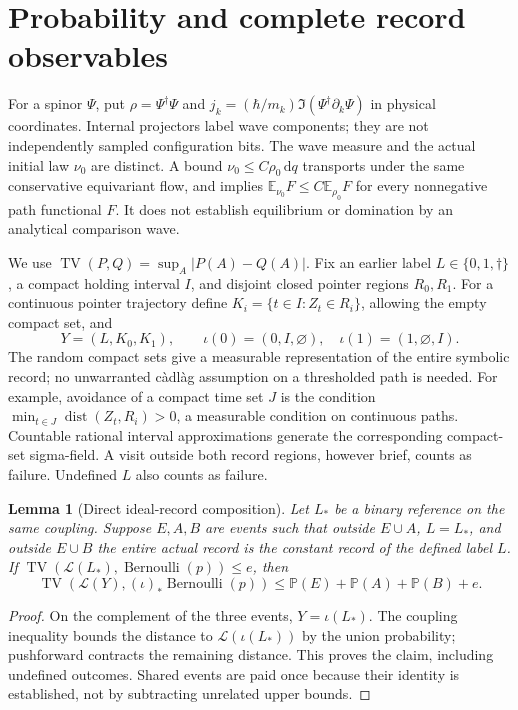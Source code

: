 \documentclass[11pt]{article}
\newtheorem{lemma}[theorem]{Lemma}
\theoremstyle{definition}\newtheorem{definition}[theorem]{Definition}
\theoremstyle{remark}\newtheorem{remark}[theorem]{Remark}
\newcommand{\Prob}{\mathbb P}\newcommand{\E}{\mathbb E}
\newcommand{\TV}{\operatorname{TV}}\newcommand{\Var}{\operatorname{Var}}
\newcommand{\dd}{\,\mathrm d}\newcommand{\Imv}{\operatorname{Im}}\newcommand{\ii}{\mathrm i}
\begin{document}
\section{Probability and complete record observables}
For a spinor $\Psi$, put $\rho=\Psi^\dagger\Psi$ and
$j_k=(\hbar/m_k)\Im(\Psi^\dagger\partial_k\Psi)$ in physical coordinates.
Internal projectors label wave components; they are not independently sampled
configuration bits. The wave measure and the actual initial law $\nu_0$ are
distinct. A bound $\nu_0\le C\rho_0\dd q$ transports under the same conservative
equivariant flow, and implies $\E_{\nu_0}F\le C\E_{\rho_0}F$ for every
nonnegative path functional $F$. It does not establish equilibrium or
domination by an analytical comparison wave.

We use $\TV(P,Q)=\sup_A|P(A)-Q(A)|$. Fix an earlier label
$L\in\{0,1,\dagger\}$, a compact holding interval $I$, and disjoint closed
pointer regions $R_0,R_1$. For a continuous pointer trajectory define
$K_i=\{t\in I:Z_t\in R_i\}$, allowing the empty compact set, and
\[
 Y=(L,K_0,K_1),\qquad
 \iota(0)=(0,I,\varnothing),\quad
 \iota(1)=(1,\varnothing,I).
\]
The random compact sets give a measurable representation of the entire
symbolic record; no unwarranted c\`adl\`ag assumption on a thresholded path
is needed. For example, avoidance of a compact time set $J$ is the condition
$\min_{t\in J}\operatorname{dist}(Z_t,R_i)>0$, a measurable condition on
continuous paths. Countable rational interval approximations generate the
corresponding compact-set sigma-field. A visit outside both record regions,
however brief, counts as failure. Undefined $L$ also counts as failure.

\begin{lemma}[Direct ideal-record composition]\label{lem:joint}
Let $L_*$ be a binary reference on the same coupling. Suppose $E,A,B$ are
events such that outside $E\cup A$, $L=L_*$, and outside $E\cup B$ the
entire actual record is the constant record of the defined label $L$.
If $\TV(\mathcal L(L_*),\operatorname{Bernoulli}(p))\le e$, then
\[
 \TV(\mathcal L(Y),(\iota)_*\operatorname{Bernoulli}(p))
 \le \Prob(E)+\Prob(A)+\Prob(B)+e.
\]
\end{lemma}
\begin{proof}
On the complement of the three events, $Y=\iota(L_*)$. The coupling
inequality bounds the distance to $\mathcal L(\iota(L_*))$ by the union
probability; pushforward contracts the remaining distance. This proves the
claim, including undefined outcomes. Shared events are paid once because
their identity is established, not by subtracting unrelated upper bounds.
\end{proof}
\end{document}
